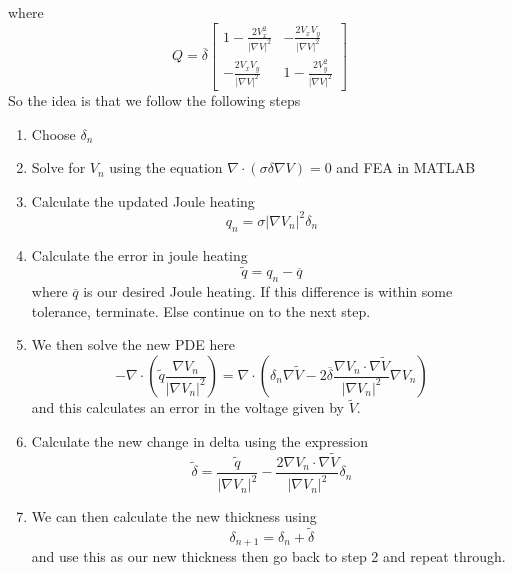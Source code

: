 \documentclass[12pt]{article}
\begin{document}
where 
\[
Q = \overline{\delta}
\begin{bmatrix}
\displaystyle 1-\frac{2V_x^2}{|\nabla V|^2} & \displaystyle -\frac{2V_xV_y}{|\nabla V|^2} \\[1em]
\displaystyle -\frac{2V_xV_y}{|\nabla V|^2} & \displaystyle 1-\frac{2V_y^2}{|\nabla V|^2}
\end{bmatrix}
\]
So the idea is that we follow the following steps
\begin{enumerate}
\item 
Choose $\delta_n$
\item
Solve for $V_n$ using the equation $\nabla \cdot (\sigma \delta \nabla V) = 0$ and FEA in MATLAB
\item
Calculate the updated Joule heating
\[
q_n = \sigma |\nabla V_n|^2 \delta_n
\]
\item
Calculate the error in joule heating
\[
\widetilde{q} = q_n - \overline{q}
\]
where $\overline{q}$ is our desired Joule heating.
If this difference is within some tolerance, terminate.
Else continue on to the next step.
\item
We then solve the new PDE here
\[
-\nabla \cdot \left( \widetilde{q} \frac{\nabla V_n}{|\nabla V_n|^2}\right) 
=
\nabla \cdot \left(\delta_n \nabla \widetilde{V} -2 \overline{\delta} \frac{\nabla {V_n}\cdot \nabla \widetilde{V}}{|\nabla {V_n}|^2}\nabla {V_n} \right) 
\]
and this calculates an error in the voltage given by $\widetilde{V}$.
\item
Calculate the new change in delta using the expression
\[
\widetilde{\delta} = \frac{\widetilde{q}}{|\nabla {V_n}|^2}-\frac{2\nabla {V_n}\cdot \nabla \widetilde{V}}{|\nabla {V_n}|^2}\delta_n
\]
\item
We can then calculate the new thickness using 
\[
\delta_{n+1} = \delta_n + \widetilde{\delta}
\]
and use this as our new thickness then go back to step 2 and repeat through.
\end{enumerate}
\end{document}
